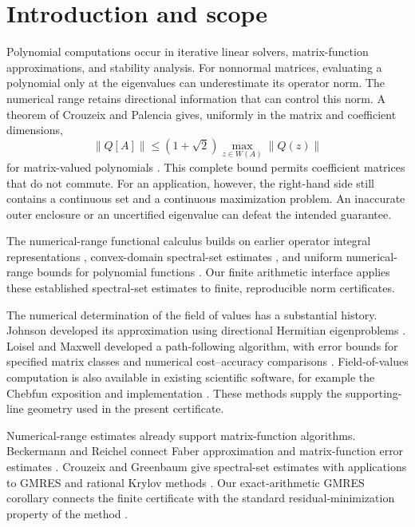 \documentclass[11pt]{article}
\newcommand{\norm}[1]{\lVert #1\rVert}
\newcommand{\W}{W}
\newcommand{\cbase}{1+\sqrt{2}}
\theoremstyle{definition}
\theoremstyle{remark}
\numberwithin{equation}{section}
\begin{document}
\section{Introduction and scope}\label{sec:intro}
Polynomial computations occur in iterative linear solvers, matrix-function
approximations, and stability analysis. For nonnormal matrices, evaluating
a polynomial only at the eigenvalues can underestimate its operator norm.
The numerical range retains directional information that can control this
norm. A theorem of Crouzeix and Palencia gives, uniformly in the matrix and
coefficient dimensions,
\begin{equation}\label{eq:CPintro}
 \norm{Q[A]}\le(\cbase)\max_{z\in\W(A)}\norm{Q(z)}
\end{equation}
for matrix-valued polynomials \citep{CrouzeixPalencia2017}.
This complete bound permits coefficient matrices that do not commute.
For an application, however, the right-hand side still contains a
continuous set and a continuous maximization problem. An inaccurate outer
enclosure or an uncertified eigenvalue can defeat the intended guarantee.

The numerical-range functional calculus builds on earlier operator
integral representations \citep{DelyonDelyon1999}, convex-domain
spectral-set estimates \citep{BadeaCrouzeixDelyon2006}, and uniform
numerical-range bounds for polynomial functions
\citep{Crouzeix2007}. Our finite arithmetic interface applies these
established spectral-set estimates to finite, reproducible norm certificates.

The numerical determination of the field of values has a substantial
history. Johnson developed its approximation using directional Hermitian
eigenproblems \citep{Johnson1978}. Loisel and Maxwell developed a
path-following algorithm, with error bounds for specified matrix classes
and numerical cost--accuracy comparisons \citep{LoiselMaxwell2018}.
Field-of-values computation is also available in existing scientific
software, for example the Chebfun exposition and implementation
\citep{Trefethen2010}. These methods supply the supporting-line geometry
used in the present certificate.

Numerical-range estimates already support matrix-function algorithms.
Beckermann and Reichel connect Faber approximation and matrix-function
error estimates \citep{BeckermannReichel2009}. Crouzeix and Greenbaum give
spectral-set estimates with applications to GMRES and rational Krylov
methods \citep{CrouzeixGreenbaum2019}. Our exact-arithmetic GMRES
corollary connects the finite certificate with the standard
residual-minimization property of the method \citep{SaadSchultz1986}.
\end{document}
